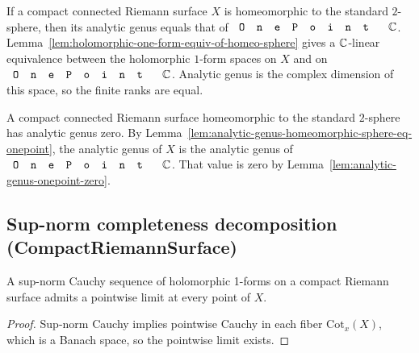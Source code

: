 \begin{lemma}
\label{lem:analytic-genus-homeomorphic-sphere-eq-onepoint}
If a compact connected Riemann surface \(X\) is homeomorphic to the standard
\(2\)-sphere, then its analytic genus equals that of
\(\code{OnePoint}\,\C\).
Lemma~\ref{lem:holomorphic-one-form-equiv-of-homeo-sphere} gives a
\(\mathbb{C}\)-linear equivalence between the holomorphic \(1\)-form spaces on \(X\)
and on \(\code{OnePoint}\,\C\). Analytic genus is the complex dimension of this
space, so the finite ranks are equal.
\end{lemma}

\begin{theorem}
\label{thm:analytic-genus-zero-of-homeomorphic-sphere}
A compact connected Riemann surface homeomorphic to the standard \(2\)-sphere
has analytic genus zero.
By Lemma~\ref{lem:analytic-genus-homeomorphic-sphere-eq-onepoint}, the analytic
genus of \(X\) is the analytic genus of \(\code{OnePoint}\,\C\). That value is
zero by Lemma~\ref{lem:analytic-genus-onepoint-zero}.
\end{theorem}

\subsection{Sup-norm completeness decomposition (CompactRiemannSurface)}
\label{sec:sup-norm-completeness-decomp}

\begin{lemma}
\label{lem:holomorphic-one-form-pointwise-limit-exists}
A sup-norm Cauchy sequence of holomorphic 1-forms on a compact
Riemann surface admits a pointwise limit at every point of \(X\).
\leanok
\end{lemma}
\begin{proof}\leanok
Sup-norm Cauchy implies pointwise Cauchy in each fiber
\(\mathrm{Cot}_x(X)\), which is a Banach space, so the pointwise limit
exists.
\end{proof}

